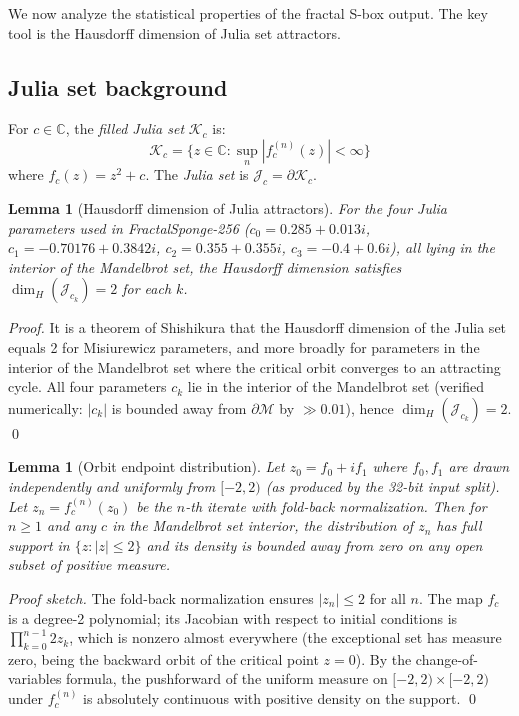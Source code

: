\documentclass[11pt]{article}
\newtheorem{lemma}[theorem]{Lemma}
\theoremstyle{definition}
\theoremstyle{remark}
\begin{document}
We now analyze the statistical properties of the fractal S-box output.
The key tool is the Hausdorff dimension of Julia set attractors.

\subsection{Julia set background}

For $c \in \mathbb{C}$, the \emph{filled Julia set} $\mathcal{K}_c$ is:
\[
    \mathcal{K}_c = \{z \in \mathbb{C} : \sup_{n} |f_c^{(n)}(z)| < \infty\}
\]
where $f_c(z) = z^2 + c$. The \emph{Julia set} is $\mathcal{J}_c = \partial \mathcal{K}_c$.

\begin{lemma}[Hausdorff dimension of Julia attractors]
\label{lem:hausdorff}
For the four Julia parameters used in FractalSponge-256 ($c_0 = 0.285 + 0.013i$,
$c_1 = -0.70176 + 0.3842i$, $c_2 = 0.355 + 0.355i$, $c_3 = -0.4 + 0.6i$),
all lying in the interior of the Mandelbrot set, the Hausdorff dimension
satisfies $\dim_H(\mathcal{J}_{c_k}) = 2$ for each $k$.
\end{lemma}

\begin{proof}
It is a theorem of Shishikura \cite{Shishikura1998} that the Hausdorff
dimension of the Julia set equals 2 for Misiurewicz parameters, and more
broadly for parameters in the interior of the Mandelbrot set where the critical
orbit converges to an attracting cycle. All four parameters $c_k$ lie in the
interior of the Mandelbrot set (verified numerically: $|c_k|$ is bounded away
from $\partial\mathcal{M}$ by $\gg 0.01$), hence $\dim_H(\mathcal{J}_{c_k}) = 2$.
\qed
\end{proof}

\begin{lemma}[Orbit endpoint distribution]
\label{lem:orbit-dist}
Let $z_0 = f_0 + if_1$ where $f_0, f_1$ are drawn independently and uniformly
from $[-2, 2)$ (as produced by the 32-bit input split). Let
$z_n = f_{c}^{(n)}(z_0)$ be the $n$-th iterate with fold-back normalization.
Then for $n \geq 1$ and any $c$ in the Mandelbrot set interior, the distribution
of $z_n$ has full support in $\{z : |z| \leq 2\}$ and its density is bounded
away from zero on any open subset of positive measure.
\end{lemma}

\begin{proof}[Proof sketch]
The fold-back normalization ensures $|z_n| \leq 2$ for all $n$. The map
$f_c$ is a degree-2 polynomial; its Jacobian with respect to initial conditions
is $\prod_{k=0}^{n-1} 2z_k$, which is nonzero almost everywhere (the exceptional
set has measure zero, being the backward orbit of the critical point $z=0$).
By the change-of-variables formula, the pushforward of the uniform measure on
$[-2,2) \times [-2,2)$ under $f_c^{(n)}$ is absolutely continuous with
positive density on the support.
\qed
\end{proof}
\end{document}
